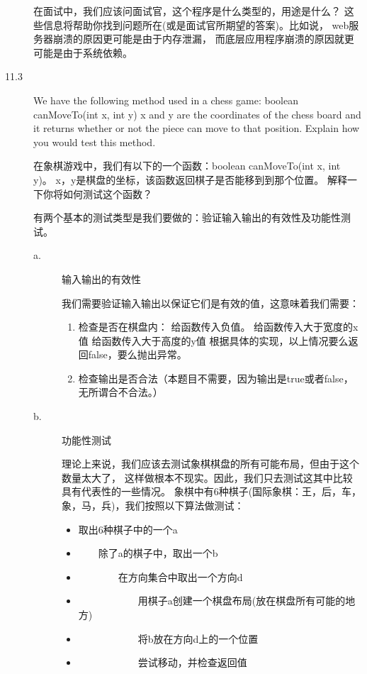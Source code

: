 \begin{description}
在面试中，我们应该问面试官，这个程序是什么类型的，用途是什么？ 这些信息将帮助你找到问题所在(或是面试官所期望的答案)。比如说， web服务器崩溃的原因更可能是由于内存泄漏， 而底层应用程序崩溃的原因就更可能是由于系统依赖。
%


\item[11.3] We have the following method used in a chess game: boolean canMoveTo(int x, int y) x and y are the coordinates of the chess board and it returns whether or not the piece can move to that position. Explain how you would test this method.

在象棋游戏中，我们有以下的一个函数：boolean canMoveTo(int x, int y)。 x，y是棋盘的坐标，该函数返回棋子是否能移到到那个位置。 解释一下你将如何测试这个函数？

有两个基本的测试类型是我们要做的：验证输入输出的有效性及功能性测试。
\begin{description}
\item[a.] 输入输出的有效性

  我们需要验证输入输出以保证它们是有效的值，这意味着我们需要：
  \begin{enumerate}
  \item 检查是否在棋盘内： 给函数传入负值。 给函数传入大于宽度的x值 给函数传入大于高度的y值 根据具体的实现，以上情况要么返回false，要么抛出异常。
  \item 检查输出是否合法（本题目不需要，因为输出是true或者false，无所谓合不合法。）
  \end{enumerate}
\item[b.] 功能性测试

  理论上来说，我们应该去测试象棋棋盘的所有可能布局，但由于这个数量太大了， 这样做根本不现实。因此，我们只去测试这其中比较具有代表性的一些情况。 象棋中有6种棋子(国际象棋：王，后，车，象，马，兵)，我们按照以下算法做测试：
  \begin{itemize}
    \itemsep=-2pt
  \item 取出6种棋子中的一个a
  \item \ \ \ \ 除了a的棋子中，取出一个b
  \item \ \ \ \ \ \ \ \ 在方向集合中取出一个方向d
  \item \ \ \ \ \ \ \ \ \ \ \ \ 用棋子a创建一个棋盘布局(放在棋盘所有可能的地方)
  \item \ \ \ \ \ \ \ \ \ \ \ \ 将b放在方向d上的一个位置
  \item \ \ \ \ \ \ \ \ \ \ \ \ 尝试移动，并检查返回值
  \end{itemize}
\end{description}
% 



\end{description}
